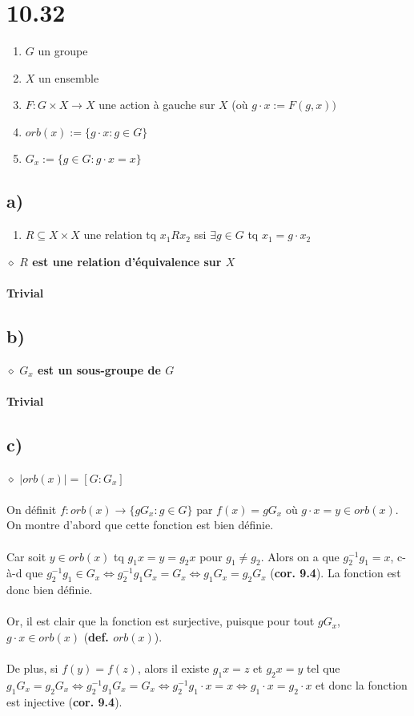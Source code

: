 \documentclass[a4paper,10pt]{article}
\begin{document}
\section*{10.32}
\begin{enumerate}
 \item $G$ un groupe
 \item $X$ un ensemble
 \item $F:G \times X \rightarrow X$ une action à gauche sur $X$ (où $g\cdot x := F(g,x))$
 \item $orb(x) := \{g\cdot x : g \in G\}$
 \item $G_x := \{g \in G : g \cdot x = x\}$
\end{enumerate}
\subsection*{a)}
\begin{enumerate}
 \item $R \subseteq X \times X$ une relation tq $x_1Rx_2$ ssi $\exists g\in G$ tq $x_1 = g \cdot x_2$
\end{enumerate}
$\diamond$ \textbf{$R$ est une relation d'équivalence sur $X$}
\\
\\
\textbf{Trivial}
\subsection*{b)}
$\diamond$ \textbf{$G_x$ est un sous-groupe de $G$}
\\
\\
\textbf{Trivial}
\subsection*{c)}
$\diamond$ \textbf{$|orb(x)| = [G:G_x]$}
\\
\\
On définit $f: orb(x) \rightarrow \{gG_x : g \in G\}$ par $f(x) = gG_x$ où $g\cdot x = y \in orb(x)$. On montre d'abord que cette
fonction est bien définie.
\\
\\
Car soit $y \in orb(x)$ tq $g_1 x = y = g_2 x$ pour $g_1 \not = g_2$. Alors on a que $g_2^{-1}g_1 = x$, c-à-d que $g_2^{-1}g_1 \in G_x
\Leftrightarrow g_2^{-1}g_1 G_x = G_x \Leftrightarrow g_1G_x = g_2G_x$ (\textbf{cor. 9.4}). La fonction est donc bien définie.
\\
\\
Or, il est clair que la fonction est surjective, puisque pour tout $gG_x$, $g\cdot x \in orb(x)$ (\textbf{def. $orb(x)$}). 
\\
\\
De plus, si $f(y) = f(z)$, alors il existe $g_1 x = z$ et $g_2 x = y$ tel que $g_1G_x = g_2G_x \Leftrightarrow g_2^{-1}g_1G_x = G_x \Leftrightarrow
 g_2^{-1}g_1 \cdot x = x \Leftrightarrow g_1 \cdot x = g_2 \cdot x$ et donc la fonction est injective (\textbf{cor. 9.4}).
 
\end{document}
